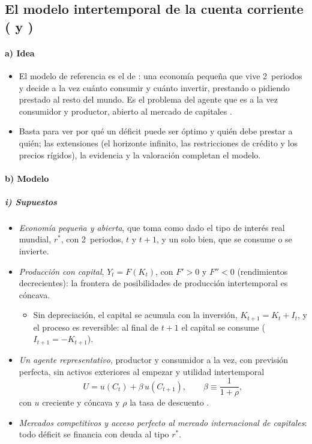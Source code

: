 \documentclass[11pt]{article}
\begin{document}
\subsection{El modelo intertemporal de la cuenta corriente\cortetitulo{} ( y )}\label{sec:intertemporal-modelo}

\paragraph{a) Idea}

\begin{itemize}
\item El modelo de referencia es el de \textcite[cap.~1]{ObstfeldRogoff1996Foundations}: una economía pequeña que vive 2~periodos y decide a la vez cuánto consumir y cuánto invertir, prestando o pidiendo prestado al resto del mundo. Es el problema del agente que es a la vez consumidor y productor, abierto al mercado de capitales .
\item Basta para ver por qué un déficit puede ser óptimo y quién debe prestar a quién; las extensiones (el horizonte infinito, las restricciones de crédito y los precios rígidos), la evidencia y la valoración completan el modelo.
\end{itemize}

\paragraph{b) Modelo}

\subparagraph{i) Supuestos}

\begin{itemize}
\item \emph{Economía pequeña y abierta}, que toma como dado el tipo de interés real mundial, $r^*$, con 2~periodos, $t$ y $t+1$, y un solo bien, que se consume o se invierte.
\item \emph{Producción con capital}, $Y_t=F(K_t)$, con $F'>0$ y $F''<0$ (rendimientos decrecientes): la frontera de posibilidades de producción intertemporal es cóncava.
  \begin{itemize}
  \item Sin depreciación, el capital se acumula con la inversión, $K_{t+1}=K_t+I_t$, y el proceso es reversible: al final de $t+1$ el capital se consume ($I_{t+1}=-K_{t+1}$).
  \end{itemize}
\item \emph{Un agente representativo}, productor y consumidor a la vez, con previsión perfecta, sin activos exteriores al empezar y utilidad intertemporal
  \begin{equation}\label{eq:utilidad-abierta}
  U=u(C_t)+\beta\,u(C_{t+1}),\qquad \beta\equiv\frac{1}{1+\rho},
  \end{equation}
  con $u$ creciente y cóncava y $\rho$ la tasa de descuento .
\item \emph{Mercados competitivos y acceso perfecto al mercado internacional de capitales}: todo déficit se financia con deuda al tipo $r^*$.
\end{itemize}
\end{document}
